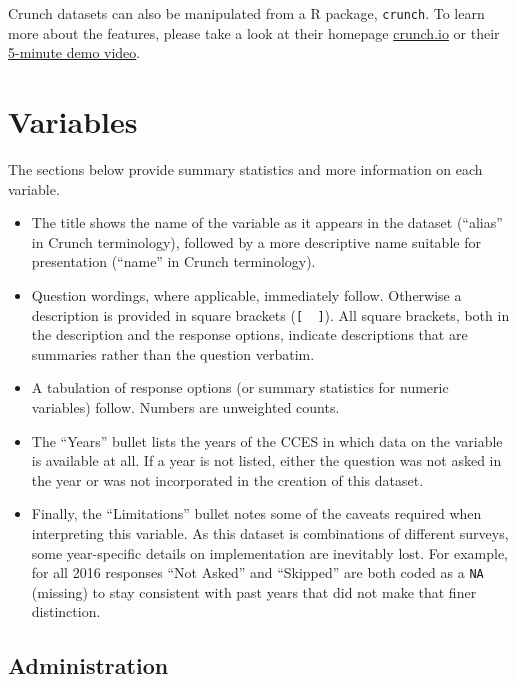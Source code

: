 \documentclass[10pt,article,oneside]{memoir}
\theoremstyle{definition}
\begin{document}
Crunch datasets can also be manipulated from a R package,
\texttt{crunch}. To learn more about the features, please take a look at
their homepage \href{https://crunch.io}{crunch.io} or their
\href{https://www.youtube.com/watch?v=zA7N_Q1EpSs}{5-minute demo video}.

\newpage

\hypertarget{variables}{%
\section{Variables}\label{variables}}

The sections below provide summary statistics and more information on
each variable.

\begin{itemize}
\tightlist
\item
  The title shows the name of the variable as it appears in the dataset
  (``alias'' in Crunch terminology), followed by a more descriptive name
  suitable for presentation (``name'' in Crunch terminology).
\item
  Question wordings, where applicable, immediately follow. Otherwise a
  description is provided in square brackets (\texttt{{[}\ \ {]}}). All
  square brackets, both in the description and the response options,
  indicate descriptions that are summaries rather than the question
  verbatim.
\item
  A tabulation of response options (or summary statistics for numeric
  variables) follow. Numbers are unweighted counts.
\item
  The ``Years'' bullet lists the years of the CCES in which data on the
  variable is available at all. If a year is not listed, either the
  question was not asked in the year or was not incorporated in the
  creation of this dataset.
\item
  Finally, the ``Limitations'' bullet notes some of the caveats required
  when interpreting this variable. As this dataset is combinations of
  different surveys, some year-specific details on implementation are
  inevitably lost. For example, for all 2016 responses ``Not Asked'' and
  ``Skipped'' are both coded as a \texttt{NA} (missing) to stay
  consistent with past years that did not make that finer distinction.
\end{itemize}

\hypertarget{administration}{%
\subsection{Administration}\label{administration}}
\end{document}

